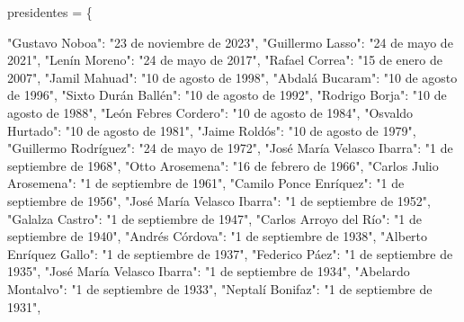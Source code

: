 \documentclass[
  a4paper,
  DIV=11,
  numbers=noendperiod,
  onepage,
  openany]{scrreprt}
\newenvironment{Shaded}{\begin{snugshade}}{\end{snugshade}}
\newcommand{\NormalTok}[1]{\textcolor[rgb]{0.00,0.23,0.31}{#1}}
\newcommand{\OperatorTok}[1]{\textcolor[rgb]{0.37,0.37,0.37}{#1}}
\newcommand{\StringTok}[1]{\textcolor[rgb]{0.13,0.47,0.30}{#1}}
\begin{document}
\begin{Shaded}
\begin{Highlighting}[]
\NormalTok{presidentes }\OperatorTok{=}\NormalTok{ \{}

    \StringTok{"Gustavo Noboa"}\NormalTok{: }\StringTok{"23 de noviembre de 2023"}\NormalTok{,}
    \StringTok{"Guillermo Lasso"}\NormalTok{: }\StringTok{"24 de mayo de 2021"}\NormalTok{,}
    \StringTok{"Lenín Moreno"}\NormalTok{: }\StringTok{"24 de mayo de 2017"}\NormalTok{,}
    \StringTok{"Rafael Correa"}\NormalTok{: }\StringTok{"15 de enero de 2007"}\NormalTok{,}
    \StringTok{"Jamil Mahuad"}\NormalTok{: }\StringTok{"10 de agosto de 1998"}\NormalTok{,}
    \StringTok{"Abdalá Bucaram"}\NormalTok{: }\StringTok{"10 de agosto de 1996"}\NormalTok{,}
    \StringTok{"Sixto Durán Ballén"}\NormalTok{: }\StringTok{"10 de agosto de 1992"}\NormalTok{,}
    \StringTok{"Rodrigo Borja"}\NormalTok{: }\StringTok{"10 de agosto de 1988"}\NormalTok{,}
    \StringTok{"León Febres Cordero"}\NormalTok{: }\StringTok{"10 de agosto de 1984"}\NormalTok{,}
    \StringTok{"Osvaldo Hurtado"}\NormalTok{: }\StringTok{"10 de agosto de 1981"}\NormalTok{,}
    \StringTok{"Jaime Roldós"}\NormalTok{: }\StringTok{"10 de agosto de 1979"}\NormalTok{,}
    \StringTok{"Guillermo Rodríguez"}\NormalTok{: }\StringTok{"24 de mayo de 1972"}\NormalTok{,}
    \StringTok{"José María Velasco Ibarra"}\NormalTok{: }\StringTok{"1 de septiembre de 1968"}\NormalTok{,}
    \StringTok{"Otto Arosemena"}\NormalTok{: }\StringTok{"16 de febrero de 1966"}\NormalTok{,}
    \StringTok{"Carlos Julio Arosemena"}\NormalTok{: }\StringTok{"1 de septiembre de 1961"}\NormalTok{,}
    \StringTok{"Camilo Ponce Enríquez"}\NormalTok{: }\StringTok{"1 de septiembre de 1956"}\NormalTok{,}
    \StringTok{"José María Velasco Ibarra"}\NormalTok{: }\StringTok{"1 de septiembre de 1952"}\NormalTok{,}
    \StringTok{"Galalza Castro"}\NormalTok{: }\StringTok{"1 de septiembre de 1947"}\NormalTok{,}
    \StringTok{"Carlos Arroyo del Río"}\NormalTok{: }\StringTok{"1 de septiembre de 1940"}\NormalTok{,}
    \StringTok{"Andrés Córdova"}\NormalTok{: }\StringTok{"1 de septiembre de 1938"}\NormalTok{,}
    \StringTok{"Alberto Enríquez Gallo"}\NormalTok{: }\StringTok{"1 de septiembre de 1937"}\NormalTok{,}
    \StringTok{"Federico Páez"}\NormalTok{: }\StringTok{"1 de septiembre de 1935"}\NormalTok{,}
    \StringTok{"José María Velasco Ibarra"}\NormalTok{: }\StringTok{"1 de septiembre de 1934"}\NormalTok{,}
    \StringTok{"Abelardo Montalvo"}\NormalTok{: }\StringTok{"1 de septiembre de 1933"}\NormalTok{,}
    \StringTok{"Neptalí Bonifaz"}\NormalTok{: }\StringTok{"1 de septiembre de 1931"}\NormalTok{,}

\end{Highlighting}
\end{Shaded}
\end{document}
